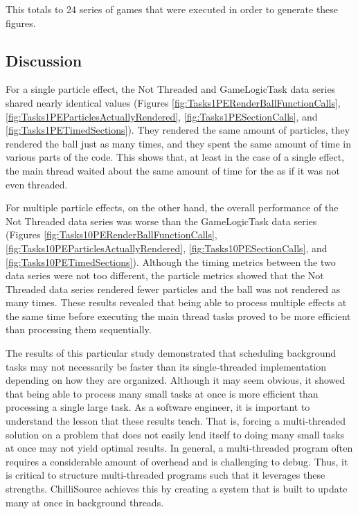 This totals to 24 series of games that were executed in order to generate these figures.

\subsection{Discussion}\label{ssec:observe_threads_discussion}

For a single particle effect, the Not Threaded and GameLogicTask data series shared nearly identical values (Figures \ref{fig:Tasks1PERenderBallFunctionCalls}, \ref{fig:Tasks1PEParticlesActuallyRendered}, \ref{fig:Tasks1PESectionCalls}, and \ref{fig:Tasks1PETimedSections}). They rendered the same amount of particles, they rendered the ball just as many times, and they spent the same amount of time in various parts of the code. This shows that, at least in the case of a single effect, the main thread waited about the same amount of time for the  as if it was not even threaded.

For multiple particle effects, on the other hand, the overall performance of the Not Threaded data series was worse than the GameLogicTask data series (Figures \ref{fig:Tasks10PERenderBallFunctionCalls}, \ref{fig:Tasks10PEParticlesActuallyRendered}, \ref{fig:Tasks10PESectionCalls}, and \ref{fig:Tasks10PETimedSections}). Although the timing metrics between the two data series were not too different, the particle metrics showed that the Not Threaded data series rendered fewer particles and the ball was not rendered as many times. These results revealed that being able to process multiple effects at the same time before executing the main thread tasks proved to be more efficient than processing them sequentially. 

The results of this particular study demonstrated that scheduling background tasks may not necessarily be faster than its single-threaded implementation depending on how they are organized. Although it may seem obvious, it showed that being able to process many small tasks at once is more efficient than processing a single large task. As a software engineer, it is important to understand the lesson that these results teach. That is, forcing a multi-threaded solution on a problem that does not easily lend itself to doing many small tasks at once may not yield optimal results. In general, a multi-threaded program often requires a considerable amount of overhead and is challenging to debug. Thus, it is critical to structure multi-threaded programs such that it leverages these strengths. ChilliSource achieves this by creating a system that is built to update many  at once in background threads.


